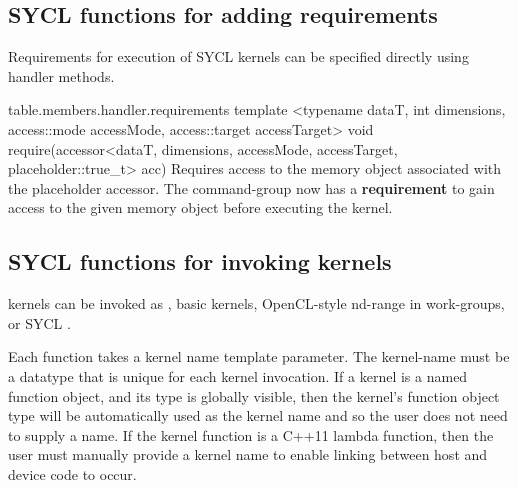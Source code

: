 \subsection{SYCL functions for adding requirements}
\label{sub.section.requirement}

Requirements for execution of SYCL kernels can be specified directly using
handler methods.

{table.members.handler.requirements}
  \addRowFourSL
    { template <typename dataT, int dimensions, }
    { access::mode accessMode, access::target accessTarget> }
    { void require(accessor<dataT, dimensions, accessMode, accessTarget, }
    { placeholder::true_t> acc) }
    {
      Requires access to the memory object associated with the placeholder
      accessor. 
      The \gls{command-group} now has a \textbf{requirement} to gain access 
      to the given memory object before executing the kernel.
    }
\completeTable


\subsection{SYCL functions for invoking kernels}
\label{subsec:invokingkernels}

\Glspl{kernel} can be invoked as , basic
 \glspl{kernel}, OpenCL-style \gls{nd-range} in
\glspl{work-group}, or SYCL .

Each function takes a kernel name template parameter. The \gls{kernel-name}
must be a datatype that is unique for each kernel invocation. If a
kernel is a named function object, and its type is globally visible,  then the
kernel's function object type will be automatically used as the kernel name and so the user does
not need to supply a name. If the kernel function is a C++11 lambda function,
then the user must manually provide a kernel name to enable linking
between host and device code to occur.

